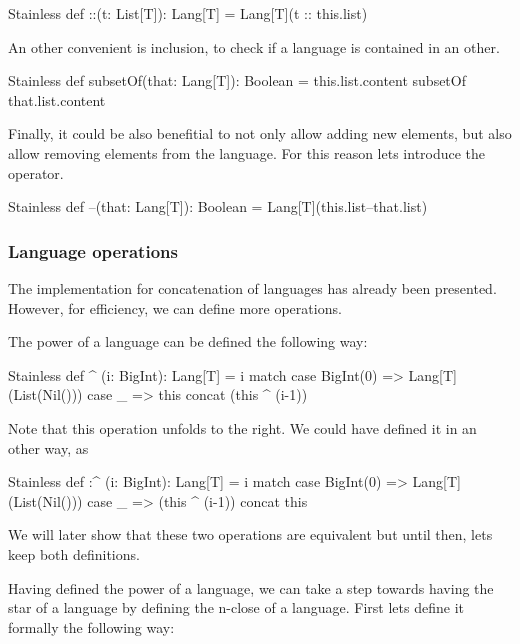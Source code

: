 \begin{ShortCode}{Stainless}
 def ::(t: List[T]): Lang[T] = Lang[T](t :: this.list)
\end{ShortCode}

An other convenient is inclusion, to check if a language is contained in an other. 

\begin{ShortCode}{Stainless}
 def subsetOf(that: Lang[T]): Boolean = 
                  this.list.content subsetOf that.list.content
\end{ShortCode}

Finally, it could be also benefitial to not only allow adding new elements, but also allow removing elements from the language. For this reason lets introduce the \inline{--} operator.

\begin{ShortCode}{Stainless}
def --(that: Lang[T]): Boolean = Lang[T](this.list--that.list)
\end{ShortCode}

\subsubsection{Language operations}

The implementation for concatenation of languages has already been presented. However, for efficiency, we can define more operations.

The power of a language can be defined the following way:

\begin{ShortCode}{Stainless}
 def ^ (i: BigInt): Lang[T] = i match {
   case BigInt(0) => Lang[T](List(Nil()))
   case _ => this concat (this ^ (i-1))
 }
\end{ShortCode}

Note that this operation unfolds to the right. We could have defined it in an other way, as 

\begin{ShortCode}{Stainless}
 def :^ (i: BigInt): Lang[T] = i match {
   case BigInt(0) => Lang[T](List(Nil()))
   case _ =>  (this ^ (i-1)) concat this
 }
\end{ShortCode}

We will later show that these two operations are equivalent but until then, lets keep both definitions.

Having defined the power of a language, we can take a step towards having the star of a language by defining the n-close of a language. First lets define it formally the following way: 

